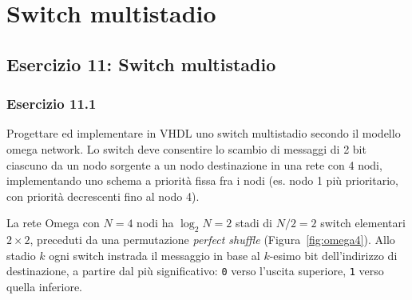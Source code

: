 \chapter{Switch multistadio}

\section{Esercizio 11: Switch multistadio}

\subsection{Esercizio 11.1}

\begin{traccia}
	Progettare ed implementare in VHDL uno switch multistadio secondo il modello omega network.
	Lo switch deve consentire lo scambio di messaggi di 2 bit ciascuno da un nodo sorgente a un
	nodo destinazione in una rete con 4 nodi, implementando uno schema a priorità fissa fra i
	nodi (es. nodo 1 più prioritario, con priorità decrescenti fino al nodo 4).
\end{traccia}

\progetto

La rete Omega con $N=4$ nodi ha $\log_2 N = 2$ stadi di $N/2 = 2$ switch elementari
$2\times2$, preceduti da una permutazione \emph{perfect shuffle}
(Figura~\ref{fig:omega4}). Allo stadio $k$ ogni switch instrada il messaggio in base al
$k$-esimo bit dell'indirizzo di destinazione, a partire dal più significativo:
\texttt{0} verso l'uscita superiore, \texttt{1} verso quella inferiore.

